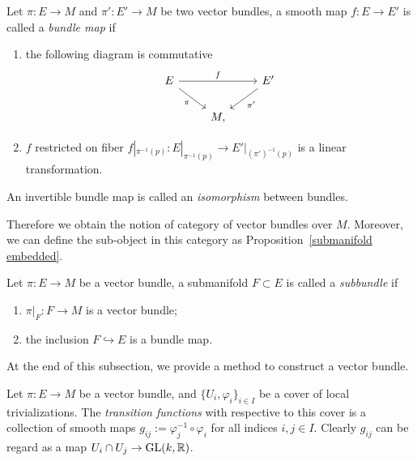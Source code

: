 \begin{defn}
    Let $\pi:E\to M$ and $\pi':E'\to M$ be two vector bundles, a smooth map $f:E\to E'$ is called a \emph{bundle map} if
    \begin{enumerate}[(1)]
        \item the following diagram is commutative
        \[\begin{tikzcd}
            E \ar[rr, "f"] \ar[rd, "\pi"'] & & E' \ar[ld, "{\pi'}"] \\
            \ & M, & \
        \end{tikzcd}\]
        \item $f$ restricted on fiber $f|_{\pi^{-1}(p)}:E|_{\pi^{-1}(p)}\to E'|_{(\pi')^{-1}(p)}$ is a linear transformation.
    \end{enumerate}
    An invertible bundle map is called an \emph{isomorphism} between bundles.
\end{defn}

Therefore we obtain the notion of category of vector bundles over $M$.
Moreover, we can define the sub-object in this category as Proposition~\ref{submanifold embedded}.

\begin{defn}
    Let $\pi:E\to M$ be a vector bundle, a submanifold $F\subset E$ is called a \emph{subbundle} if
    \begin{enumerate}[(1)]
        \item $\pi|_F:F\to M$ is a vector bundle;
        \item the inclusion $F\hookrightarrow E$ is a bundle map.
    \end{enumerate}
\end{defn}

At the end of this subsection, we provide a method to construct a vector bundle.

\begin{defn}
    Let $\pi:E\to M$ be a vector bundle, and $\{U_i,\varphi_i\}_{i\in I}$ be a cover of local trivializations.
    The \emph{transition functions} with respective to this cover is a collection of smooth maps $g_{ij}:=\varphi_j^{-1}\circ\varphi_i$ for all indices $i,j\in I$.
    Clearly $g_{ij}$ can be regard as a map $U_i\cap U_j\to\mathrm{GL}(k,\mathbb{R})$.
\end{defn}

